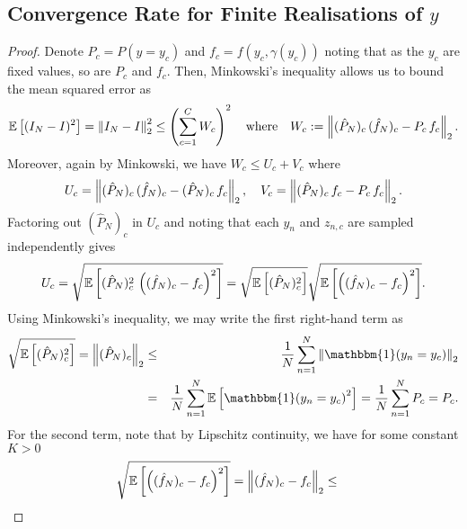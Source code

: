 
\subsection{Convergence Rate for Finite Realisations of $y$}
\label{sec:app:finite-res}

\thefiniteres*

\begin{proof}
	Denote
	$P_c = P(y = y_c)$ and
	$f_c = f(y_c, \gamma(y_c))$
	noting that as the $y_c$ are fixed values, so are $P_c$ and $f_c$.
	Then, Minkowski's inequality allows us to bound the mean squared error as
	\begin{eqnarray*}
		\mathbb{E}\left[(I_N - I)^2\right] = \left\lVert I_N - I\right\rVert_2^2
		\leq \left(\sum_{c=1}^C W_c \right)^2 \quad \text{where} \quad W_c := \left\lVert(\hat{P}_N)_c \, (\hat{f}_N)_c - P_c \, f_c\right\rVert_2.
	\end{eqnarray*}
	Moreover, again by Minkowski, we have $W_c \leq U_c + V_c$
	where 
	\[
	U_c = \left\lVert(\hat{P}_N)_c \, (\hat{f}_N)_c - (\hat{P}_N)_c \, f_c\right\rVert_2, \quad
	V_c = \left\lVert(\hat{P}_N)_c \, f_c - P_c \, f_c\right\rVert_2.
	\]
	Factoring out $(\hat{P}_N)_c$ in $U_c$ and noting that each $y_n$ and $z_{n,c}$ are sampled independently gives
	\begin{eqnarray*}
		U_c = \sqrt{\mathbb{E}\left[(\hat{P}_N)_c^2 \, \left((\hat{f}_N)_c - f_c\right)^2\right]} 
		= \sqrt{\mathbb{E}\left[(\hat{P}_N)_c^2\right]} \sqrt{\mathbb{E}\left[\left((\hat{f}_N)_c - f_c\right)^2\right]}.
	\end{eqnarray*}
	Using Minkowski's
	inequality, we may write the first right-hand term as
	\begin{eqnarray*}
		\sqrt{\E\left[(\hat{P}_N)_c^2\right]} = \norm{(\hat{P}_N)_c}_2
		&\leq& \frac{1}{N} \sum_{n=1}^N \norm{\mathbbm{1}(y_n = y_c)}_2 \\
		&=&\frac{1}{N} \sum_{n=1}^N \E \left[{\mathbbm{1}(y_n = y_c)}^2\right] 
		= \frac{1}{N} \sum_{n=1}^N P_c
		= P_c.
	\end{eqnarray*}
	For the second term, note that by Lipschitz continuity, we have for some constant $K >
	0$
	\begin{eqnarray*}
		\sqrt{\E\left[\left((\hat{f}_N)_c - f_c\right)^2\right]} = \norm{(\hat{f}_N)_c - f_c}_2 &\leq& 

\end{eqnarray*}
\end{proof}
